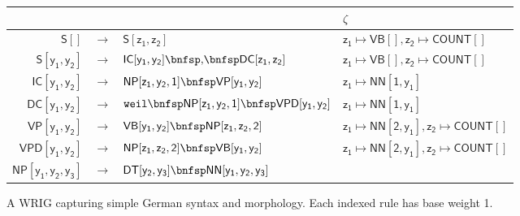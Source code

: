 \documentclass[11pt]{article}
\renewcommand{\bnfpn}[1]{\mathsf{#1}}
\renewcommand{\bnfpo}{\rightarrow}
\renewcommand{\bnfts}[1]{\mathtt{#1}}
\begin{document}
\begin{figure}[t]
\center
\begin{tabular}{rcl|l} 
&&&$\zeta$\\
\hline \hline
$\bnfpn{S[]}$ &$\bnfpo$& $\bnfpn{S[z_1, z_2]}$ & $\bnfpn{z_1} \mapsto \bnfpn{VB[]}, \bnfpn{z_2} \mapsto \bnfpn{COUNT[]}$ \\
$\bnfpn{S[y_1, y_2]}$ &$\bnfpo$& $\bnfpn{IC[y_1, y_2]} \bnfsp \bnfts{,} \bnfsp \bnfpn{DC[z_1, z_2]}$ &  $\bnfpn{z_1} \mapsto \bnfpn{VB[]}, \bnfpn{z_2} \mapsto \bnfpn{COUNT[]}$\\
$\bnfpn{IC[y_1, y_2]}$ &$\bnfpo$& $\bnfpn{NP[z_1, y_2, 1]} \bnfsp \bnfpn{VP[y_1, y_2]}$ &  $\bnfpn{z_1} \mapsto \bnfpn{NN[1, y_1]}$\\
$\bnfpn{DC[y_1, y_2]}$ &$\bnfpo$& $\bnfts{weil}\bnfsp \bnfpn{NP[z_1, y_2, 1]} \bnfsp \bnfpn{VPD[y_1, y_2]}$ &  $\bnfpn{z_1} \mapsto \bnfpn{NN[1, y_1]}$\\
$\bnfpn{VP[y_1, y_2]}$ &$\bnfpo$& $\bnfpn{VB[y_1, y_2]} \bnfsp \bnfpn{NP[z_1, z_2, 2]}$ &  $\bnfpn{z_1} \mapsto \bnfpn{NN[2, y_1]}, \bnfpn{z_2} \mapsto \bnfpn{COUNT[]}$\\
$\bnfpn{VPD[y_1, y_2]}$ &$\bnfpo$& $\bnfpn{NP[z_1, z_2, 2]} \bnfsp \bnfpn{VB[y_1, y_2]}$ &  $\bnfpn{z_1} \mapsto \bnfpn{NN[2, y_1]}, \bnfpn{z_2} \mapsto \bnfpn{COUNT[]}$\\
$\bnfpn{NP[y_1, y_2, y_3]}$ &$\bnfpo$& $\bnfpn{DT[y_2, y_3]} \bnfsp \bnfpn{NN[y_1, y_2, y_3]}$ & 
\end{tabular}
\caption{A WRIG capturing simple German syntax and morphology. Each indexed rule has base weight 1.\label{fig:german_wrig}}
\end{figure}

\end{document}

